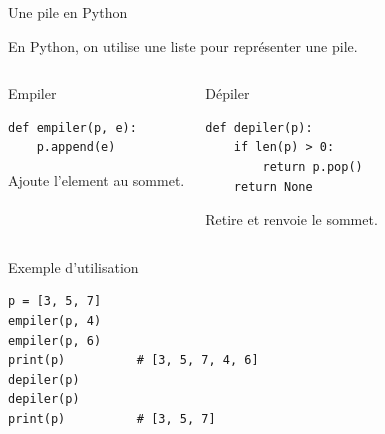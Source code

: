 \documentclass[10pt]{beamer}
\begin{document}
\begin{frame}[fragile]{Une pile en Python}

En Python, on utilise une liste pour représenter une pile.


\begin{columns}[T]


\begin{block}{Empiler}
\begin{lstlisting}
def empiler(p, e):
    p.append(e)
\end{lstlisting}

Ajoute l'element au sommet.
\end{block}


\begin{block}{Dépiler}
\begin{lstlisting}
def depiler(p):
    if len(p) > 0:
        return p.pop()
    return None
\end{lstlisting}

Retire et renvoie le sommet.
\end{block}

\end{columns}

\medskip

\begin{exampleblock}{Exemple d'utilisation}
\begin{lstlisting}
p = [3, 5, 7]
empiler(p, 4)
empiler(p, 6)
print(p)          # [3, 5, 7, 4, 6]
depiler(p)
depiler(p)
print(p)          # [3, 5, 7]
\end{lstlisting}
\end{exampleblock}

\end{frame}


\end{document}

